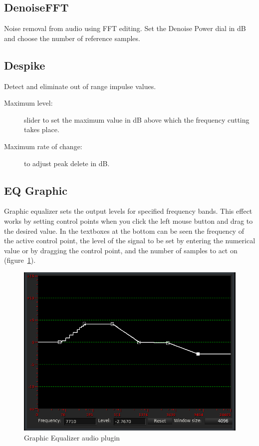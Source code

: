 \subsection{DenoiseFFT}%
\label{sub:denoisefft}

Noise removal from audio using FFT editing. Set the Denoise Power dial in dB and choose the number of reference samples.

\subsection{Despike}%
\label{sub:despike}

Detect and eliminate out of range impulse values.

\begin{description}
    \item[Maximum level:] slider to set the maximum value in dB above which the frequency cutting takes place.
    \item[Maximum rate of change:] to adjust peak delete in dB.
\end{description}

\subsection{EQ Graphic}%
\label{sub:eq_graphic}

Graphic equalizer sets the output levels for specified frequency bands. This effect works by setting control points when you click the left mouse button and drag to the desired value. In the textboxes at the bottom can be seen the frequency of the active control point, the level of the signal to be set by entering the numerical value or by dragging the control point, and the number of samples to act on (figure~\ref{fig:equalizer}).

\begin{figure}[htpb]
    \centering
    \includegraphics[width=0.7\linewidth]{images/equalizer.png}
    \caption{Graphic Equalizer audio plugin}
    \label{fig:equalizer}
\end{figure}

